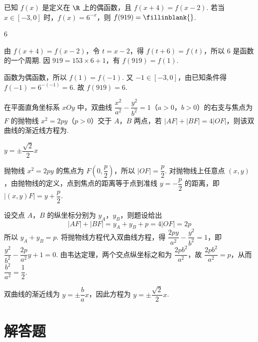 \begin{problem}
已知 \(f(x)\) 是定义在 \(\R\) 上的偶函数，且 \(f(x+4)=f(x-2)\). 若当 \(x\in\left[-3,0\right]\) 时，\(f(x)=6^{-x}\)，则 \(f(919)=\fillinblank{}\).
\end{problem}

\begin{answer}
6
\end{answer}

\begin{solution}
由 \(f(x+4)=f(x-2)\)，令 \(t=x-2\)，得 \(f(t+6)=f(t)\)，所以 \(6\) 是函数的一个周期. 因 \(919=153\times6+1\)，有 \(f(919)=f(1)\).

函数为偶函数，所以 \(f(1)=f(-1)\). 又 \(-1\in[-3,0]\)，由已知条件得 \(f(-1)=6^{-(-1)}=6\). 故 \(f(919)=6\).
\end{solution}

\begin{problem}
在平面直角坐标系 \(xOy\) 中，双曲线 \(\dfrac{x^2}{a^2}-\dfrac{y^2}{b^2}=1\)（\(a>0\)，\(b>0\)）的右支与焦点为 \(F\) 的抛物线 \(x^2=2py\)（\(p>0\)）交于 \(A\)，\(B\) 两点，若 \(\lvert AF\rvert+\lvert BF\rvert=4\lvert OF\rvert\)，则该双曲线的渐近线方程为\fillinblank{}.
\end{problem}

\begin{answer}
\(y=\pm\dfrac{\sqrt{2}}{2}x\)
\end{answer}

\begin{solution}
抛物线 \(x^2=2py\) 的焦点为 \(F\left(0,\dfrac p2\right)\)，所以 \(\lvert OF\rvert=\dfrac p2\). 对抛物线上任意点 \((x,y)\)，由抛物线的定义，点到焦点的距离等于点到准线 \(y=-\dfrac p2\) 的距离，即 \(\lvert (x,y)F\rvert=y+\dfrac p2\).

设交点 \(A\)，\(B\) 的纵坐标分别为 \(y_A\)，\(y_B\)，则题设给出
\[
\lvert AF\rvert+\lvert BF\rvert=y_A+y_B+p=4\lvert OF\rvert=2p
\]
所以 \(y_A+y_B=p\). 将抛物线方程代入双曲线方程，得
\(\dfrac{2py}{a^2}-\dfrac{y^2}{b^2}=1\)，即
\(\dfrac{y^2}{b^2}-\dfrac{2p}{a^2}y+1=0\). 由韦达定理，两个交点纵坐标之和为 \(\dfrac{2pb^2}{a^2}\)，故
\(\dfrac{2pb^2}{a^2}=p\)，从而 \(\dfrac{b^2}{a^2}=\dfrac12\).

双曲线的渐近线为 \(y=\pm\dfrac ba x\)，因此方程为 \(y=\pm\dfrac{\sqrt2}{2}x\).
\end{solution}

\section{解答题}


